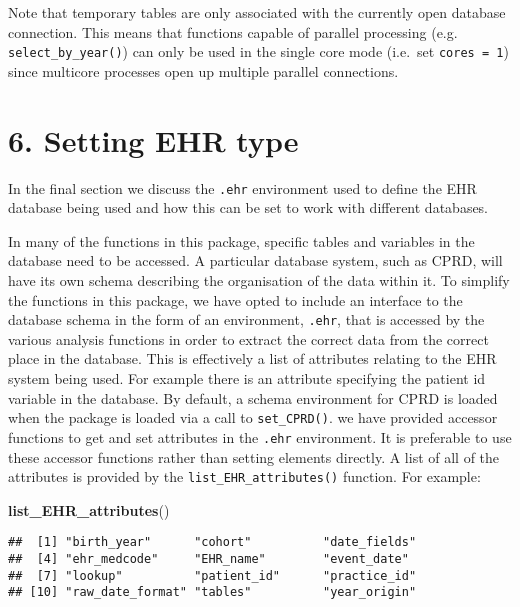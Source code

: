 \documentclass[]{article}
\newenvironment{Shaded}{\begin{snugshade}}{\end{snugshade}}
\newcommand{\KeywordTok}[1]{\textcolor[rgb]{0.13,0.29,0.53}{\textbf{{#1}}}}
\newcommand{\NormalTok}[1]{{#1}}
\begin{document}
Note that temporary tables are only associated with the currently open
database connection. This means that functions capable of parallel
processing (e.g. \texttt{select\_by\_year()}) can only be used in the
single core mode (i.e.~set \texttt{cores = 1}) since multicore processes
open up multiple parallel connections.

\section{6. Setting EHR type}\label{setting-ehr-type}

In the final section we discuss the \texttt{.ehr} environment used to
define the EHR database being used and how this can be set to work with
different databases.

In many of the functions in this package, specific tables and variables
in the database need to be accessed. A particular database system, such
as CPRD, will have its own schema describing the organisation of the
data within it. To simplify the functions in this package, we have opted
to include an interface to the database schema in the form of an
environment, \texttt{.ehr}, that is accessed by the various analysis
functions in order to extract the correct data from the correct place in
the database. This is effectively a list of attributes relating to the
EHR system being used. For example there is an attribute specifying the
patient id variable in the database. By default, a schema environment
for CPRD is loaded when the package is loaded via a call to
\texttt{set\_CPRD()}. we have provided accessor functions to get and set
attributes in the \texttt{.ehr} environment. It is preferable to use
these accessor functions rather than setting elements directly. A list
of all of the attributes is provided by the
\texttt{list\_EHR\_attributes()} function. For example:

\begin{Shaded}
\begin{Highlighting}[]
\KeywordTok{list_EHR_attributes}\NormalTok{()}
\end{Highlighting}
\end{Shaded}

\begin{verbatim}
##  [1] "birth_year"      "cohort"          "date_fields"    
##  [4] "ehr_medcode"     "EHR_name"        "event_date"     
##  [7] "lookup"          "patient_id"      "practice_id"    
## [10] "raw_date_format" "tables"          "year_origin"
\end{verbatim}
\end{document}
